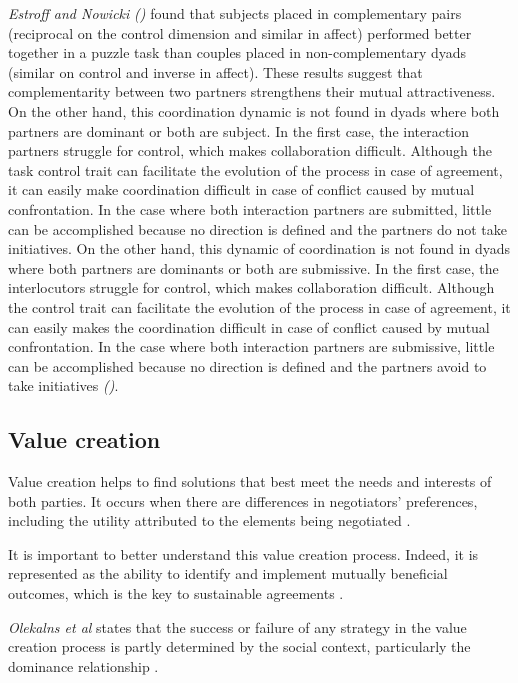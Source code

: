 \documentclass[10pt, a4paper]{article} %
\begin{document}
				\emph{Estroff and Nowicki} \emph{(\cite{estroff1992interpersonal})} found that subjects placed in complementary pairs (reciprocal on the control dimension and similar in affect) performed better together in a puzzle task than couples placed in non-complementary dyads (similar on control and inverse in affect). These results suggest that complementarity between two partners strengthens their mutual attractiveness.
				On the other hand, this coordination dynamic is not found in dyads where both partners are dominant or both are subject. 
				In the first case, the interaction partners struggle for control, which makes collaboration difficult. Although the task control trait can facilitate the evolution of the process in case of agreement, it can easily make coordination difficult in case of conflict caused by mutual confrontation. In the case where both interaction partners are submitted, little can be accomplished because no direction is defined and the partners do not take initiatives.
				On the other hand, this dynamic of coordination  is not found in dyads where both partners are dominants or both are submissive. 
				In the first case, the interlocutors struggle for control, which makes collaboration difficult. Although the control trait can facilitate the evolution of the process in case of agreement, it can easily makes the coordination difficult in case of conflict caused by mutual confrontation. In the case where both interaction partners are submissive, little can be accomplished because no direction is defined and the partners avoid to take initiatives \emph{(\cite{wiltermuth2015benefits})}.
				
		\subsection{Value creation}
				
				Value creation helps to find solutions that best meet the needs and interests of both parties. It occurs when there are differences in negotiators' preferences, including the utility attributed to the elements being negotiated \cite{lax1986managerial}. 
				
				It is important to better understand this value creation process. Indeed, it is represented as the ability to identify and implement mutually beneficial outcomes, which is the key to sustainable agreements \cite{wiltermuth2015benefits}.
				
				\emph{Olekalns et al} states that the success or failure of any strategy in the value creation process is partly determined by the social context, particularly the dominance relationship \cite{olekalns2013dyadic}.
				
\end{document}
